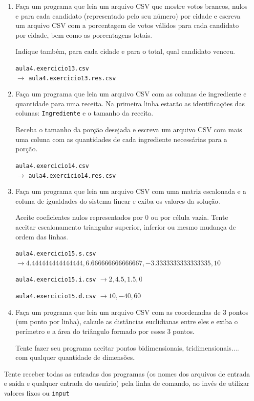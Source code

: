 \begin{enumerate}
	\texttt{aula4.exercicio12.p.csv} \\	
	\texttt{aula4.exercicio12.n.csv} \\ 
	$\rightarrow$
	\texttt{aula4.exercicio12.res.csv}

\quebra
	
	\item Faça um programa que leia um arquivo CSV que mostre votos brancos, nulos e para cada candidato (representado pelo seu número) por cidade
	e escreva um arquivo CSV com a porcentagem de votos válidos para cada candidato por cidade, bem como as porcentagens totais.
	
	Indique também, para cada cidade e para o total, qual candidato venceu.

	\texttt{aula4.exercicio13.csv}  
	\\ $\rightarrow$
	\texttt{aula4.exercicio13.res.csv}

\quebra	

	\item Faça um programa que leia um arquivo CSV com as colunas de ingrediente e quantidade para uma receita.
	Na primeira linha estarão as identificações das colunas: \texttt{Ingrediente} e o tamanho da receita.
	
	Receba o tamanho da porção desejada e escreva um arquivo CSV com mais uma coluna com as quantidades de cada ingrediente necessárias para a porção.
	
	\texttt{aula4.exercicio14.csv}  
	\\ $\rightarrow$
	\texttt{aula4.exercicio14.res.csv}

\quebra	

	\item Faça um programa que leia um arquivo CSV com uma matriz escalonada e a coluna de igualdades do sistema linear e exiba os valores da solução. 
	
	Aceite coeficientes nulos representados por 0 ou por célula vazia.
	Tente aceitar escalonamento triangular superior, inferior ou mesmo mudança de ordem das linhas.
	
	\texttt{aula4.exercicio15.s.csv}
	\\ $\rightarrow 4.444444444444444, 6.666666666666667, -3.3333333333333335, 10$
	
	\texttt{aula4.exercicio15.i.csv}
	$\rightarrow 2, 4.5, 1.5, 0$
	
	\texttt{aula4.exercicio15.d.csv}
	$\rightarrow 10, -40, 60$
	
	

	\item Faça um programa que leia um arquivo CSV com as coordenadas de 3 pontos (um ponto por linha), calcule as distâncias euclidianas entre eles e exiba o perímetro e a área do triângulo formado por esses 3 pontos.
	
	Tente fazer seu programa aceitar pontos bidimensionais, tridimensionais.... com qualquer quantidade de dimensões.

\end{enumerate}

Tente receber todas as entradas dos programas (os nomes dos arquivos de entrada e saída e qualquer entrada do usuário) pela linha de comando, ao invés de utilizar valores fixos ou \texttt{input}